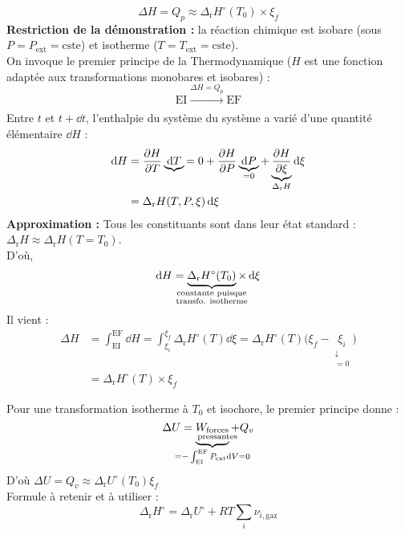 \documentclass{article}
\newcommand{\Dr}{\Delta_{\mathrm{r}}}
\newcommand{\ext}{\text{ext}}
\newcommand{\cste}{\text{cste}}
\newcommand{\EI}{\mathrm{EI}}
\newcommand{\EF}{\mathrm{EF}}
\newcommand{\fp}{\substack{\text{forces}\\\mathclap{\text{pressantes}}}}
\begin{document}
\begin{tableau}
    \begin{equation*}
        \Delta H = Q_p \approx \Dr H^\circ(T_0)\times \xi_f
    \end{equation*}
    \tcbline
    \textbf{Restriction de la démonstration :} la réaction chimique est isobare (sous $P=P_\ext=\cste$) et isotherme ($T=T_\ext=\cste$).\\
    
    On invoque le premier principe de la Thermodynamique ($H$ est une fonction adaptée aux transformations monobares et isobares) :
    $$\EI \xrightarrow[]{\Delta H = Q_p} \EF$$
    Entre $t$ et $t+\dd{t}$, l'enthalpie du système du système a varié d'une quantité élémentaire $\dd{H}$ :
    \begin{align*}
        \dd{H}&=\pdv{H}{T}\underbrace{\dd{T}}{=0} + \pdv{H}{P}\underbrace{\dd{P}}_{=0} + \underbrace{\pdv{H}{\xi}}_{\Dr H}\dd{\xi} \\
        &=\Dr H(T,P,\xi)\dd{\xi}
    \end{align*}
    \textbf{Approximation :} Tous les constituants sont dans leur état standard : $\Dr H \approx \Dr H(T=T_0)$.\\
    D'où,
    \begin{equation*}
        \dd{H} = \underbrace{\Dr H^\circ(T_0)}_{\mathclap{\substack{\text{constante puisque}\\\text{transfo. isotherme}}}} \times \dd{\xi}
    \end{equation*}
    Il vient :
    \begin{align*}
        \Delta H &= \int_\EI^\EF \dd{H} = \int_{\xi_i}^{\xi_f} \Dr H^\circ(T)\dd{\xi} = \Dr H^\circ(T)\big(\xi_f-\underset{\substack{\downarrow\\=0}}{\xi_i}\big)\\
        &= \Dr H^\circ(T)\times \xi_f
    \end{align*}
    
    \begin{remarque}[Remarque]
        Pour une transformation isotherme à $T_0$ et isochore, le premier principe donne :
    $$\Delta U = \underbrace{W_{\fp}}_{\mathclap{=-\int_\EI^\EF P_\ext \dd{V} = 0}} + Q_v$$
    D'où $\Delta U = Q_v \approx \Dr U^\circ (T_0) \xi_f$\\
    
    Formule à retenir et à utiliser :\\
    \begin{equation*}
        \Dr H^\circ = \Dr U^\circ +  RT\sum_i \nu_{i,\mathrm{gaz}}
    \end{equation*}
    \end{remarque}
    

\end{tableau}
\end{document}
